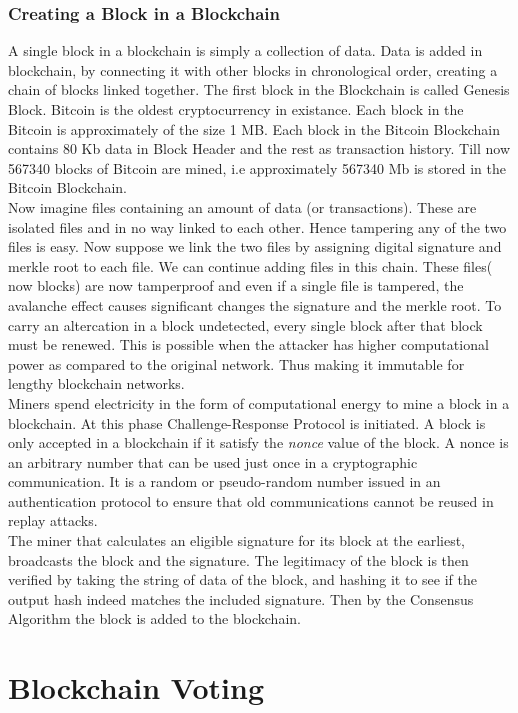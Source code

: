 \documentclass{report}
\begin{document}
\subsection{Creating a Block in a Blockchain}
A single block in a blockchain is simply a collection of data. Data is added in blockchain, by connecting it with other blocks in chronological order, creating a chain of blocks linked together. The first block in the Blockchain is called Genesis Block. Bitcoin is the oldest cryptocurrency in existance. Each block in the Bitcoin is approximately of the size 1 MB. Each block in the Bitcoin Blockchain contains 80 Kb data in Block Header and the rest as transaction history. Till now 567340 blocks of Bitcoin are mined, i.e approximately 567340 Mb is stored in the Bitcoin Blockchain.\\ \cite{WinNT27}
Now imagine files containing an amount of data (or transactions). These are isolated files and in no way linked to each other. Hence tampering any of the two files is easy. Now suppose we link the two files by assigning digital signature and merkle root to each file. We can continue adding files in this chain. These files( now blocks) are now tamperproof and even if a single file is tampered, the avalanche effect causes significant changes the signature and the merkle root. To carry an altercation in a block undetected, every single block after that block must be renewed. This is possible when the attacker has higher computational power as compared to the original network. Thus making it immutable for lengthy blockchain networks.
\\
Miners spend electricity in the form of computational energy to mine a block in a blockchain. At this phase Challenge-Response Protocol is initiated. A block is only accepted in a blockchain if it satisfy the \textit{nonce} value of the block. A nonce is an arbitrary number that can be used just once in a cryptographic communication. It is a random or pseudo-random number issued in an authentication protocol to ensure that old communications cannot be reused in replay attacks.\\
The miner that calculates an eligible signature for its block at the earliest, broadcasts the block and the signature. The legitimacy of the block is then verified by taking the string of data of the block, and hashing it to see if the output hash indeed matches the included signature. Then by the Consensus Algorithm the block is added to the  blockchain.\cite{WinNT28}

\chapter{Blockchain Voting}
\end{document}
